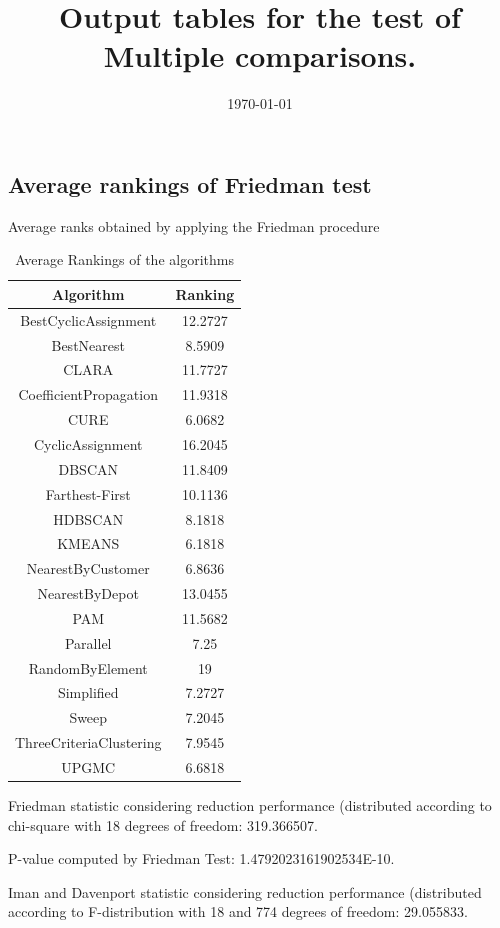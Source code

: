 \documentclass[a4paper,10pt]{article}
\title{Output tables for the test of Multiple comparisons.}
\author{}
\date{\today}
\begin{document}
\begin{landscape}
\pagestyle{empty}
\maketitle
\thispagestyle{empty}
\section{Average rankings of Friedman test}



Average ranks obtained by applying the Friedman procedure

\begin{table}[!htp]
\centering
\begin{tabular}{|c|c|}\hline
Algorithm&Ranking\\\hline
BestCyclicAssignment & 12.2727\\
BestNearest & 8.5909\\
CLARA & 11.7727\\
CoefficientPropagation & 11.9318\\
CURE & 6.0682\\
CyclicAssignment & 16.2045\\
DBSCAN & 11.8409\\
Farthest-First & 10.1136\\
HDBSCAN & 8.1818\\
KMEANS & 6.1818\\
NearestByCustomer & 6.8636\\
NearestByDepot & 13.0455\\
PAM & 11.5682\\
Parallel & 7.25\\
RandomByElement & 19\\
Simplified & 7.2727\\
Sweep & 7.2045\\
ThreeCriteriaClustering & 7.9545\\
UPGMC & 6.6818\\
\hline
\end{tabular}
\caption{Average Rankings of the algorithms}
\end{table}

Friedman statistic considering reduction performance (distributed according to chi-square with 18 degrees of freedom: 319.366507.

P-value computed by Friedman Test: 1.4792023161902534E-10.\newline

Iman and Davenport statistic considering reduction performance (distributed according to F-distribution with 18 and 774 degrees of freedom: 29.055833.


\end{landscape}
\end{document}
